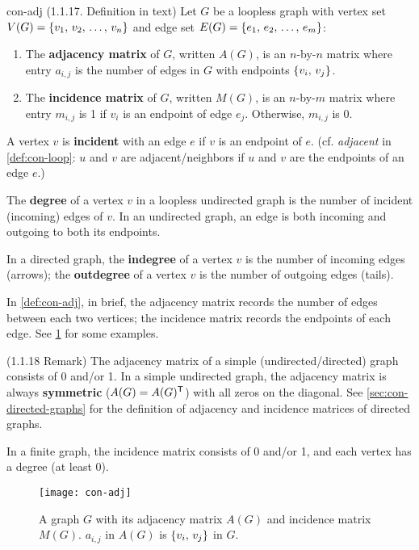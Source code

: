 \documentclass[../src/handouts/main.tex]{subfiles}
\begin{document}
\begin{definition}{}{con-adj}
  (1.1.17. Definition in text)
  Let $G$ be a loopless graph with vertex set $V(G) = \lbrace v_1,\, v_2,\, \ldots,\, v_n\rbrace$ and edge set $E(G) = \lbrace e_1,\, e_2,\, \ldots,\, e_m\rbrace$:

  \begin{enumerate}
    \item The \textbf{adjacency matrix} of $G$, written $A(G)$, is an $n$-by-$n$ matrix where entry $a_{i,j}$ is the number of edges in $G$ with endpoints $\lbrace v_i,\, v_j\rbrace$.
    \item The \textbf{incidence matrix} of $G$, written $M(G)$, is an $n$-by-$m$ matrix where entry $m_{i,j}$ is 1 if $v_i$ is an endpoint of edge $e_j$. Otherwise, $m_{i,j}$ is 0.
  \end{enumerate}

  A vertex $v$ is \textbf{incident} with an edge $e$ if $v$ is an endpoint of $e$. (cf. \textit{adjacent} in \cref{def:con-loop}: $u$ and $v$ are adjacent/neighbors if $u$ and $v$ are the endpoints of an edge $e$.)

  The \textbf{degree} of a vertex $v$ in a loopless undirected graph is the number of incident (incoming) edges of $v$. In an undirected graph, an edge is both incoming and outgoing to both its endpoints.

  In a directed graph, the \textbf{indegree} of a vertex $v$ is the number of incoming edges (arrows); the \textbf{outdegree} of a vertex $v$ is the number of outgoing edges (tails).
\end{definition}

In \cref{def:con-adj}, in brief, the adjacency matrix records the number of edges between each two vertices; the incidence matrix records the endpoints of each edge. See \cref{fig:con-adj} for some examples.

(1.1.18 Remark) The adjacency matrix of a simple (undirected/directed) graph consists of 0 and/or 1. In a simple undirected graph, the adjacency matrix is always \textbf{symmetric} ($A(G) = A(G)^{\mathsf{T}}$) with all zeros on the diagonal. See \cref{sec:con-directed-graphs} for the definition of adjacency and incidence matrices of directed graphs.

In a finite graph, the incidence matrix consists of 0 and/or 1, and each vertex has a degree (at least 0).

\begin{figure}[htbp]
  \centering
  \texttt{[image: con-adj]}
  \caption{A graph $G$ with its adjacency matrix $A(G)$ and incidence matrix $M(G)$. $a_{i,j}$ in $A(G)$ is $\lbrace v_i,\, v_j\rbrace$ in $G$.}
  \label{fig:con-adj}
\end{figure}
\end{document}
